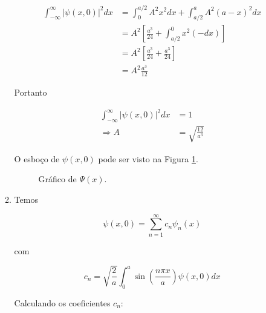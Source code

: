 \documentclass[a4paper, 12pt, notitlepage]{article}
\begin{document}
\begin{enumerate}
\begin{enumerate}
  \begin{align*}
  \int_{-\infty}^{\infty} |\psi(x,0)|^2 dx &= \int_0^{a/2} A^2 x^2 dx + \int_{a/2}^a A^2 (a-x)^2 dx \\
  &= A^2 \left[ \frac{a^3}{24} + \int_{a/2}^{0} x^2 (-dx) \right] \\
  &= A^2 \left[ \frac{a^3}{24} + \frac{a^3}{24} \right] \\
  &= A^2 \frac{a^3}{12}
  \end{align*}
  
  Portanto
  
  \begin{align*}
  \int_{-\infty}^{\infty} |\psi(x,0)|^2 dx &= 1 \\
  \Rightarrow A &= \sqrt{\frac{12}{a^3}}
  \end{align*}
  
  O esboço de $\psi(x,0)$ pode ser visto na Figura \ref{fig:psi.prob.1}.

  \begin{figure}[!h]
    \centering
  \caption{Gráfico de $\Psi(x)$.}
  \label{fig:psi.prob.1}
  \end{figure}
  
  \item Temos
  
  \begin{equation*}
  \psi(x,0) = \sum_{n = 1}^{\infty} c_n \psi_n(x)
  \end{equation*}
  
  \noindent com
  
  \begin{equation*}
  c_n = \sqrt{\frac{2}{a}} \int_0^a \sin\left(\frac{n\pi x}{a}\right) \psi(x,0) dx
  \end{equation*}
  
  Calculando os coeficientes $c_n$:
  

\end{enumerate}
\end{enumerate}
\end{document}
